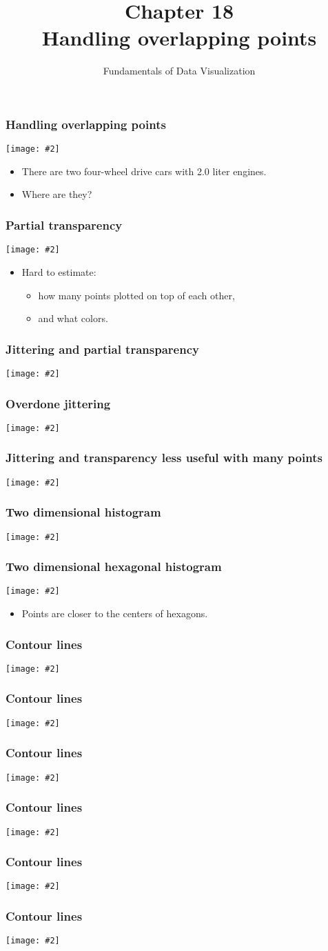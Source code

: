 \documentclass{beamer}
\author{Fundamentals of Data Visualization}
\title{Chapter 18\\Handling overlapping points}
\newcommand{\bi}{\begin{itemize}}
\newcommand{\li}{\item}
\newcommand{\ei}{\end{itemize}}
\newcommand{\fig}[2]{\centerline{\texttt{[image: \#2]}}}
\newcommand{\bfr}[1]{\begin{frame}[fragile]\frametitle{{ #1 }}}
\begin{document}
\begin{frame}
\maketitle
\end{frame}

\bfr{Handling overlapping points}
\fig{.8}{mpg-cty-displ-solid-1.png}
\bi
\li There are two four-wheel drive cars with 2.0 liter engines.
\li Where are they?
\ei
\end{frame}

\bfr{Partial transparency}
\fig{.8}{mpg-cty-displ-transp-1.png}
\bi
\li Hard to estimate:\bi
\li how many points plotted on top of each other,
\li and what colors.
\ei\ei
\end{frame}

\bfr{Jittering and partial transparency}
\fig{.8}{mpg-cty-displ-jitter-1.png}
\end{frame}


\bfr{Overdone jittering}
\fig{.8}{mpg-cty-displ-jitter-extreme-1.png}
\end{frame}

\bfr{Jittering and transparency less useful with many points}
\fig{.8}{nycflights-points-1.png}
\end{frame}

\bfr{Two dimensional histogram}
\fig{.8}{nycflights-2d-bins-1.png}
\end{frame}

\bfr{Two dimensional hexagonal histogram}
\fig{.8}{nycflights-hex-bins-1.png}
\bi
\li Points are closer to the centers of hexagons.
\ei
\end{frame}

\bfr{Contour lines}
\fig{1}{blue-jays-contour-1.png}
\end{frame}
\bfr{Contour lines}
\fig{1}{blue-jays-contour-filled-1.png}
\end{frame}
\bfr{Contour lines}
\fig{1}{blue-jays-contour-by-sex-1.png}
\end{frame}


\bfr{Contour lines}
\fig{1}{diamonds-points-1.png}
\end{frame}


\bfr{Contour lines}
\fig{1}{diamonds-contour-colors-1.png}
\end{frame}


\bfr{Contour lines}
\fig{1}{diamonds-contour-facets-1.png}
\end{frame}
\end{document}
